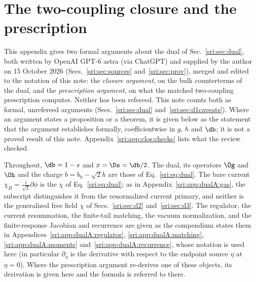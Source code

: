\section{The two-coupling closure and the prescription}\label{sri:app:clos}
This appendix gives two formal arguments about the dual of Sec.~\ref{sri:sec:dual}, both written by OpenAI GPT-6 astra
(via ChatGPT) and supplied by the author on 15 October 2026 (Secs.~\ref{sri:sec:sources} and~\ref{sri:sec:prov}), merged and edited to the
notation of this note: the \emph{closure argument}, on the bulk counterterms of the dual, and the \emph{prescription
argument}, on what the matched two-coupling prescription computes. Neither has been refereed. This note counts both as
formal, unrefereed arguments (Secs.~\ref{sri:sec:dual} and~\ref{sri:sec:d1caveats}). Where an argument states a proposition
or a theorem, it is given below as the statement that the argument establishes formally, coefficientwise in $g$, $h$
and $\db$; it is not a proved result of this note. Appendix~\ref{sri:app:clos:checks} lists what the review checked.

Throughout, $\db=1-s$ and $x=\Ds=\db/2$. The dual, its operators $\Og$ and $\Oh$ and the charge $b=b_0-\sqrt2h$
are those of Eq.~\eqref{sri:eq:dual}. The bare current $\chi_B=\frac{\mathrm i}{\sqrt2}\partial\phi$ is the $\chi$ of
Eq.~\eqref{sri:eq:dual}; as in Appendix~\ref{sri:app:dualA:gas}, the subscript distinguishes it from the renormalized current
primary, and neither is the generalized free field $\chi$ of Secs.~\ref{sri:sec:d2} and~\ref{sri:sec:d3}. The regulator, the
current resummation, the finite-tail matching, the vacuum normalization, and the finite-response Jacobian and
recurrence are given as the compendium states them in Appendices~\ref{sri:app:dualA:regulator}, \ref{sri:app:dualA:matching},
\ref{sri:app:dualA:moments} and~\ref{sri:app:dualA:recurrence}, whose notation is used here (in particular $\partial_\eta$ is
the derivative with respect to the endpoint source $\eta$ at $\eta=0$). Where the prescription argument re-derives
one of these objects, its derivation is given here and the formula is referred to there.

